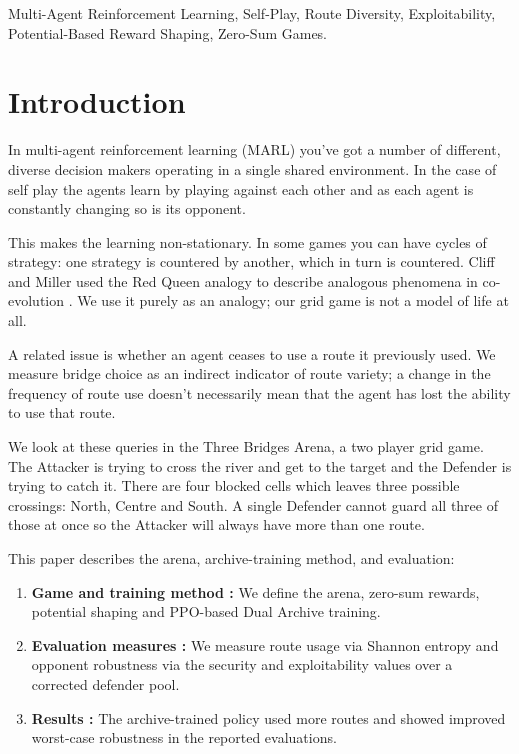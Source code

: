 \documentclass[conference]{IEEEtran}
\begin{document}
\begin{IEEEkeywords} 
Multi-Agent Reinforcement Learning, Self-Play, Route Diversity, Exploitability, Potential-Based Reward Shaping, Zero-Sum Games. 
\end{IEEEkeywords} 

\section{Introduction} 
In multi-agent reinforcement learning (MARL) you've got a number of different, diverse decision makers operating in a single shared environment. In the case of self play the agents learn by playing against each other and as each agent is constantly changing so is its opponent. 

This makes the learning non-stationary. In some games you can have cycles of strategy: one strategy is countered by another, which in turn is countered. Cliff and Miller used the Red Queen analogy to describe analogous phenomena in co-evolution \cite{cliff1995tracking}. We use it purely as an analogy; our grid game is not a model of life at all. 

A related issue is whether an agent ceases to use a route it previously used. We measure bridge choice as an indirect indicator of route variety; a change in the frequency of route use doesn't necessarily mean that the agent has lost the ability to use that route. 

We look at these queries in the Three Bridges Arena, a two player grid game. The Attacker is trying to cross the river and get to the target and the Defender is trying to catch it. There are four blocked cells which leaves three possible crossings: North, Centre and South. A single Defender cannot guard all three of those at once so the Attacker will always have more than one route. 

This paper describes the arena, archive-training method, and evaluation: 
\begin{enumerate} 
       \item \textbf{Game and training method :} We define the arena, zero-sum rewards, potential shaping and PPO-based Dual Archive training. 
       \item \textbf{Evaluation measures :} We measure route usage via Shannon entropy and opponent robustness via the security and exploitability values over a corrected defender pool. 
       \item \textbf{Results :} The archive-trained policy used more routes and showed improved worst-case robustness in the reported evaluations.
\end{enumerate}
\end{document}
